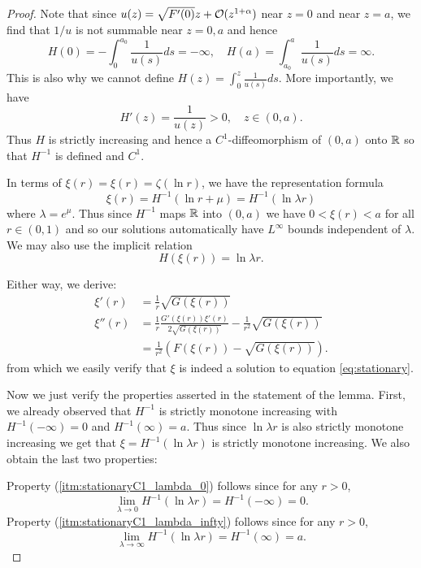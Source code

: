 \documentclass{amsart}
\begin{document}
\begin{proof}
Note that since \(u(z) = \sqrt{F'(0)} z + \operatorname{\mathcal{O}}(z^{1 + \alpha})\) near \(z=0\) and near \(z=a\), we find that \(1/u\) is not summable near \(z = 0, a\) and hence
\[
H(0) = - \int_0^{a_0} \frac{1}{u(s)} ds = - \infty, \quad H(a) = \int_{a_0}^a \frac{1}{u(s)} ds = \infty.
\]
This is also why we cannot define \(H(z) = \int_{0}^z \frac{1}{u(s)} ds\). More importantly, we have
\[
H'(z) = \frac{1}{u(z)} > 0, \quad z \in (0, a).
\]
Thus \(H\) is strictly increasing and hence a \(C^1\)-diffeomorphism of \((0, a)\) onto \(\mathbb{R}\) so that \(H^{-1}\) is defined and \(C^1\).

In terms of \(\xi(r) = \xi(r) = \zeta(\ln r)\), we have the representation formula
\begin{equation}
\label{eq:stationaryC1}
\xi(r) = H^{-1} (\ln r + \mu) = H^{-1} (\ln \lambda r)
\end{equation}
where \(\lambda = e^{\mu}\). Thus since \(H^{-1}\) maps \(\mathbb{R}\) into \((0, a)\) we have \(0 < \xi(r) < a\) for all \(r \in (0, 1)\) and so our solutions automatically have \(L^{\infty}\) bounds independent of \(\lambda\). We may also use the implicit relation
\[
H (\xi(r)) =  \ln \lambda r.
\]

Either way, we derive:
\begin{align*}
\xi'(r) &= \frac{1}{r}  \sqrt{G(\xi(r))} \\
\xi''(r) &= \frac{1}{r} \frac{G'(\xi(r)) \xi'(r)}{2 \sqrt{G(\xi(r))}} - \frac{1}{r^2} \sqrt{G(\xi(r))} \\
&= \frac{1}{r^2} \left(F(\xi(r))- \sqrt{G(\xi(r))}\right).
\end{align*}
from which we easily verify that \(\xi\) is indeed a solution to equation \eqref{eq:stationary}.

Now we just verify the properties asserted in the statement of the lemma. First, we already observed that \(H^{-1}\) is strictly monotone increasing with \(H^{-1}(-\infty) = 0\) and \(H^{-1}(\infty) = a\). Thus since \(\ln \lambda r\) is also strictly monotone increasing we get that \(\xi = H^{-1} (\ln \lambda r)\) is strictly monotone increasing. We also obtain the last two properties:

Property (\ref{itm:stationaryC1_lambda_0}) follows since for any \(r > 0\),
\[
\lim_{\lambda \to 0} H^{-1}(\ln \lambda r) = H^{-1}(-\infty) = 0.
\]
Property (\ref{itm:stationaryC1_lambda_infty}) follows since for any \(r > 0\),
\[
\lim_{\lambda \to \infty} H^{-1}(\ln \lambda r) = H^{-1}(\infty) = a.
\]


\end{proof}
\end{document}
